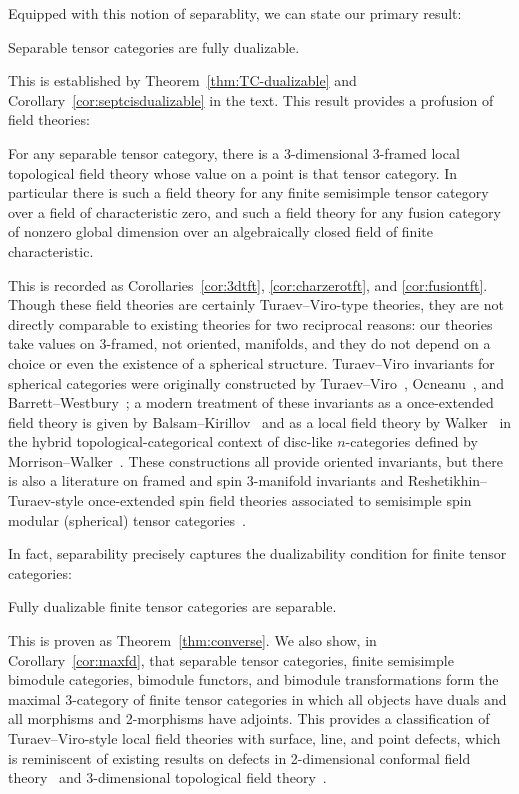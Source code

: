 \documentclass{amsart}
\begin{document}
Equipped with this notion of separablity, we can state our primary result:
\begin{maintheorem} \label{thm1}
Separable tensor categories are fully dualizable.
\end{maintheorem}
\nid This is established by Theorem~\ref{thm:TC-dualizable} and Corollary~\ref{cor:septcisdualizable} in the text.  This result provides a profusion of field theories:
\begin{maincor} \label{cor2}
For any separable tensor category, there is a 3-dimensional 3-framed local topological field theory whose value on a point is that tensor category.  In particular there is such a field theory for any finite semisimple tensor category over a field of characteristic zero, and such a field theory for any fusion category of nonzero global dimension over an algebraically closed field of finite characteristic.
\end{maincor}
\nid This is recorded as Corollaries~\ref{cor:3dtft}, \ref{cor:charzerotft}, and \ref{cor:fusiontft}.  Though these field theories are certainly Turaev--Viro-type theories, they are not directly comparable to existing theories for two reciprocal reasons: our theories take values on 3-framed, not oriented, manifolds, and they do not depend on a choice or even the existence of a spherical structure.  Turaev--Viro invariants for spherical categories were originally constructed by Turaev--Viro~\cite{MR1191386, MR1292673}, Ocneanu~\cite{MR1317353}, and Barrett--Westbury~\cite{bw-invariants,MR1686423}; a modern treatment of these invariants as a once-extended field theory is given by Balsam--Kirillov~\cite{1004.1533,1010.1222,1012.0560} and as a local field theory by Walker~\cite{kw:tqft} in the hybrid topological-categorical context of disc-like $n$-categories defined by Morrison--Walker~\cite{1009.5025}.  These constructions all provide oriented invariants, but there is also a literature on framed and spin 3-manifold invariants and Reshetikhin--Turaev-style once-extended spin field theories associated to semisimple spin modular (spherical) tensor categories~\cite{MR1117149, MR1171303, MR1387228, MR1880321}.

In fact, separability precisely captures the dualizability condition for finite tensor categories:
\begin{maintheorem} \label{thm3}
Fully dualizable finite tensor categories are separable.
\end{maintheorem}
\nid This is proven as Theorem~\ref{thm:converse}.  We also show, in Corollary~\ref{cor:maxfd}, that separable tensor categories, finite semisimple bimodule categories, bimodule functors, and bimodule transformations form the maximal 3-category of finite tensor categories in which all objects have duals and all morphisms and 2-morphisms have adjoints.  This provides a classification of Turaev--Viro-style local field theories with surface, line, and point defects, which is reminiscent of existing results on defects in 2-dimensional conformal field theory~\cite{ffrs-duality,frs-fusion} and 3-dimensional topological field theory~\cite{kapustinsaulina,kitaevkong,fsv}.
\end{document}
